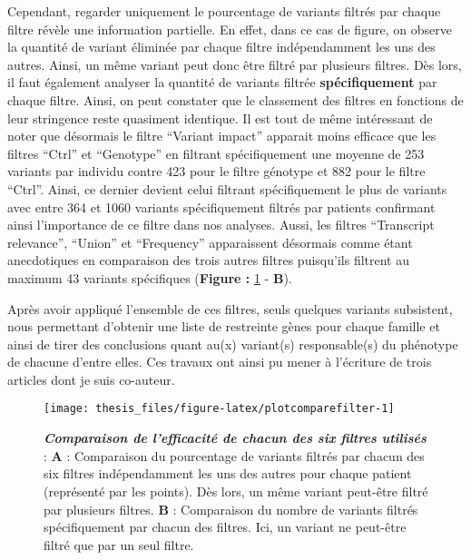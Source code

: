 \documentclass[12pt,a4paper,twoside]{ugathesis}
\begin{document}
Cependant, regarder uniquement le pourcentage de variants filtrés par
chaque filtre révèle une information partielle. En effet, dans ce cas de
figure, on observe la quantité de variant éliminée par chaque filtre
indépendamment les uns des autres. Ainsi, un même variant peut donc être
filtré par plusieurs filtres. Dès lors, il faut également analyser la
quantité de variants filtrée \textbf{spécifiquement} par chaque filtre.
Ainsi, on peut constater que le classement des filtres en fonctions de
leur stringence reste quasiment identique. Il est tout de même
intéressant de noter que désormais le filtre ``Variant impact'' apparait
moins efficace que les filtres ``Ctrl'' et ``Genotype'' en filtrant
spécifiquement une moyenne de 253 variants par individu contre 423 pour
le filtre génotype et 882 pour le filtre ``Ctrl''. Ainsi, ce dernier
devient celui filtrant spécifiquement le plus de variants avec entre 364
et 1060 variants spécifiquement filtrés par patients confirmant ainsi
l'importance de ce filtre dans nos analyses. Aussi, les filtres
``Transcript relevance'', ``Union'' et ``Frequency'' apparaissent
désormais comme étant anecdotiques en comparaison des trois autres
filtres puisqu'ils filtrent au maximum 43 variants spécifiques
(\textbf{Figure :} \ref{fig:plotcomparefilter} - \textbf{B}).

Après avoir appliqué l'ensemble de ces filtres, seuls quelques variants
subsistent, nous permettant d'obtenir une liste de restreinte gènes pour
chaque famille et ainsi de tirer des conclusions quant au(x) variant(s)
responsable(s) du phénotype de chacune d'entre elles. Ces travaux ont
ainsi pu mener à l'écriture de trois articles dont je suis co-auteur.

\newpage

\begin{figure}

{\centering \texttt{[image: thesis\_files/figure-latex/plotcomparefilter-1]} 

}

\caption[Comparaison de l'efficacité de chacun des six filtres utilisés]{\textbf{\emph{Comparaison de l'efficacité de
chacun des six filtres utilisés}} : \textbf{A} : Comparaison du
pourcentage de variants filtrés par chacun des six filtres
indépendamment les uns des autres pour chaque patient (représenté par
les points). Dès lors, un même variant peut-être filtré par plusieurs
filtres. \textbf{B} : Comparaison du nombre de variants filtrés
spécifiquement par chacun des filtres. Ici, un variant ne peut-être
filtré que par un seul filtre.}\label{fig:plotcomparefilter}
\end{figure}
\end{document}
